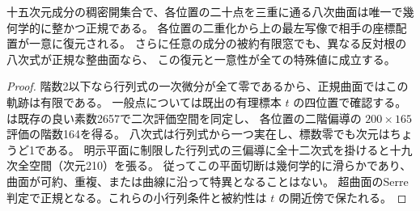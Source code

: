 \begin{corollary}\label{cor:normal-octics-general-finite-chart}
十五次元成分の稠密開集合で、各位置の二十点を三重に通る八次曲面は唯一で幾何学的に整かつ正規である。
各位置の二重化から上の最左写像で相手の座標配置が一意に復元される。
さらに任意の成分の被約有限窓でも、異なる反対根の八次式が正規な整曲面なら、
この復元と一意性が全ての特殊値に成立する。
\end{corollary}
\begin{proof}
階数2以下なら行列式の一次微分が全て零であるから、正規曲面ではこの軌跡は有限である。
一般点については既出の有理標本 $t$ の四位置で確認する。
 は既存の良い素数2657で二次評価空間を同定し、
各位置の二階偏導の $200\times165$ 評価の階数164を得る。
八次式は行列式から一つ実在し、標数零でも次元はちょうど1である。
明示平面に制限した行列式の三偏導に全十二次式を掛けると十九次全空間（次元210）を張る。
従ってこの平面切断は幾何学的に滑らかであり、曲面が可約、重複、または曲線に沿って特異となることはない。
超曲面のSerre判定で正規となる。これらの小行列条件と被約性は $t$ の開近傍で保たれる。
\end{proof}
